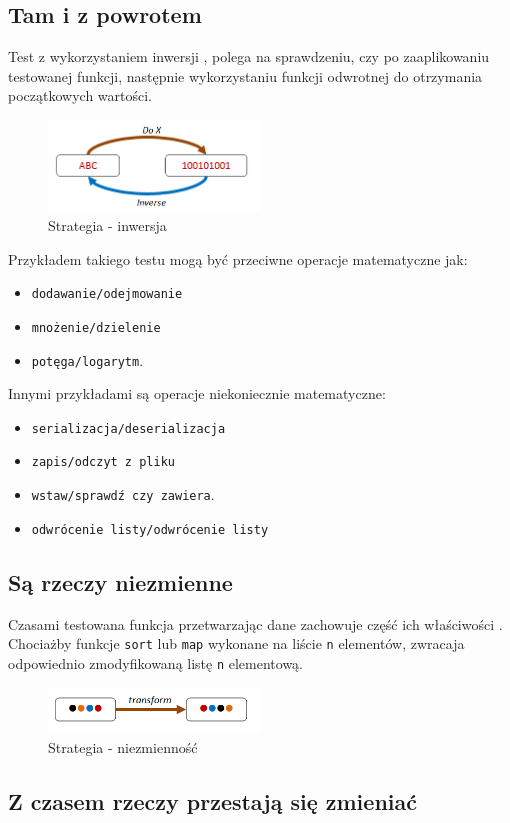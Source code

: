 \subsection{Tam i z powrotem}

Test z wykorzystaniem inwersji , polega na sprawdzeniu, czy po zaaplikowaniu testowanej funkcji, następnie wykorzystaniu funkcji odwrotnej do otrzymania początkowych wartości.   
\begin{figure}
    \centering
    \includegraphics[width=0.5\textwidth]{images/property_inverse.png}
    \caption{Strategia - inwersja}
    \label{fig:inverse_strategy}
\end{figure}
Przykładem takiego testu mogą być przeciwne operacje matematyczne jak:
\begin{itemize}
    \item \texttt{dodawanie/odejmowanie}
    \item \texttt{mnożenie/dzielenie}
    \item \texttt{potęga/logarytm}.
\end{itemize} 
Innymi przykładami są operacje niekoniecznie matematyczne:
\begin{itemize}
    \item \texttt{serializacja/deserializacja}
    \item \texttt{zapis/odczyt z pliku}
    \item \texttt{wstaw/sprawdź czy zawiera}.
    \item \texttt{odwrócenie listy/odwrócenie listy}
\end{itemize} 

\subsection{Są rzeczy niezmienne}

Czasami testowana funkcja przetwarzając dane zachowuje część ich właściwości . Chociażby funkcje \texttt{sort} lub \texttt{map} wykonane na liście \texttt{n} elementów, zwracaja odpowiednio zmodyfikowaną listę \texttt{n} elementową.

\begin{figure}
    \centering
    \includegraphics[width=0.5\textwidth]{images/property_invariant.png}
    \caption{Strategia - niezmienność}
    \label{fig:invariant_strategy}
\end{figure}

\subsection{Z czasem rzeczy przestają się zmieniać}